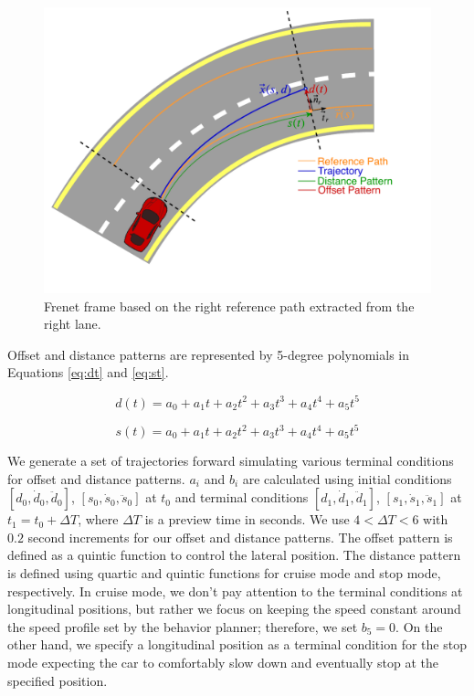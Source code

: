 \begin{figure}[h]
  \centering
  \includegraphics[width=1.0\textwidth]{figures/frenet-frame.pdf}
  \caption[Frenet frame]{Frenet frame based on the right reference path
    extracted from the right lane.}
  \label{figure:frenet}
\end{figure}

Offset and distance patterns are represented by 5-degree polynomials
in Equations \eqref{eq:dt} and \eqref{eq:st}.

\begin{equation}
  d(t) = a_0 + a_1t + a_2t^2 + a_3t^3 + a_4t^4 + a_5t^5
  \label{eq:dt}
\end{equation}

\begin{equation}
  s(t) = a_0 + a_1t + a_2t^2 + a_3t^3 + a_4t^4 + a_5t^5
  \label{eq:st}
\end{equation}

We generate a set of trajectories forward simulating various terminal
conditions for offset and distance patterns. $a_i$ and $b_i$ are calculated
using initial conditions $[d_0, \dot{d}_0, \ddot{d}_0]$, $[s_0, \dot{s}_0,
\ddot{s}_0]$ at $t_0$ and terminal conditions $[d_1, \dot{d}_1, \ddot{d}_1]$,
$[s_1, \dot{s}_1, \ddot{s}_1]$ at $t_1 = t_0 + \Delta T$, where $\Delta T$ is a
preview time in seconds. We use $4 < \Delta T < 6$ with $0.2$ second increments
for our offset and distance patterns. The offset pattern is defined as a
quintic function to control the lateral position. The distance pattern is
defined using quartic and quintic functions for cruise mode and stop mode,
respectively. In cruise mode, we don't pay attention to the terminal conditions
at longitudinal positions, but rather we focus on keeping the speed constant
around the speed profile set by the behavior planner; therefore, we set $b_5 =
0$. On the other hand, we specify a longitudinal position as a terminal
condition for the stop mode expecting the car to comfortably slow down and
eventually stop at the specified position.

